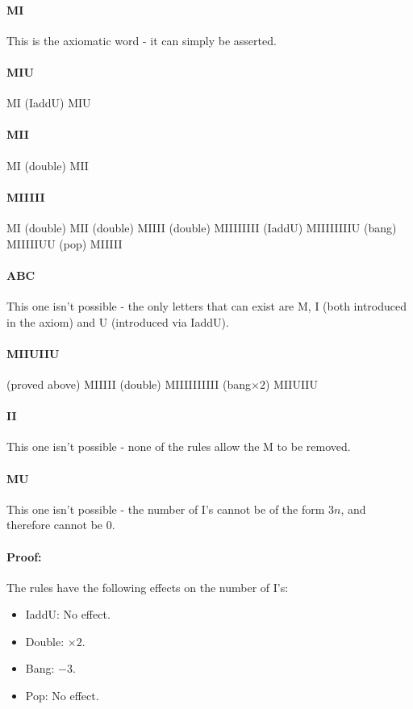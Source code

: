 \documentclass{article}
\begin{document}
\paragraph{MI}
This is the axiomatic word - it can simply be asserted.

\paragraph{MIU}
MI (IaddU) MIU

\paragraph{MII}
MI (double) MII

\paragraph{MIIIII}
MI (double) MII (double) MIIII (double) MIIIIIIII 
(IaddU) MIIIIIIIIU (bang) MIIIIIUU (pop) MIIIII

\paragraph{ABC}
This one isn't possible - the only letters that can exist are M, I
(both introduced in the axiom) and U (introduced via IaddU).

\paragraph{MIIUIIU}
(proved above) MIIIII (double) MIIIIIIIIII (bang$\times 2$) MIIUIIU

\paragraph{II}
This one isn't possible - none of the rules allow the M to be removed. 

\paragraph{MU}
This one isn't possible - the number of I's cannot be of the form
$3n$, and therefore cannot be 0. 

\paragraph{Proof:}
The rules have the following effects
on the number of I's:

\begin{itemize}
	\item IaddU: No effect.
	\item Double: $\times 2$.
	\item Bang: $-3$.
	\item Pop: No effect.
\end{itemize}
\end{document}

